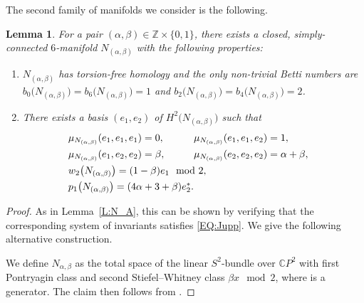 \documentclass[pdftex]{sigma}
\numberwithin{equation}{section}
\newtheorem{Lemma}[Theorem]{Lemma}
\theoremstyle{definition}
\numberwithin{table}{section}
\newcommand{\Z}{\mathbb{Z}}
\newcommand{\C}{\mathbb{C}}
\begin{document}
The second family of manifolds we consider is the following.

\begin{Lemma}%
	For a pair $(\alpha,\beta)\in\Z\times\{0,1\}$, there exists a closed, simply-connected $6$-manifold $N_{(\alpha,\beta)}$ with the following properties:
	\begin{enumerate}\itemsep=0pt
		\item[$(1)$] $N_{(\alpha,\beta)}$ has torsion-free homology and the only non-trivial Betti numbers are $b_0\bigl(N_{(\alpha,\beta)}\bigr)=b_6\bigl(N_{(\alpha,\beta)}\bigr)=1$ and $b_2\bigl(N_{(\alpha,\beta)}\bigr)=b_4\bigl(N_{(\alpha,\beta)}\bigr)=2$.
		\item[$(2)$] There exists a basis $(e_1,e_2)$ of $H^2\bigl(N_{(\alpha,\beta)}\bigr)$ such that
		\begin{alignat*}{3}
			&\mu_{N_{(\alpha,\beta)}}(e_1,e_1,e_1)=0,\qquad&&
			\mu_{N_{(\alpha,\beta)}}(e_1,e_1,e_2)=1,&\\
			&\mu_{N_{(\alpha,\beta)}}(e_1,e_2,e_2)=\beta,\qquad&&
			\mu_{N_{(\alpha,\beta)}}(e_2,e_2,e_2)=\alpha+\beta,&\\
			&\makebox[0pt][l]{$w_2\bigl(N_{(\alpha,\beta)}\bigr)=(1-\beta)e_1\mod 2,$}&\\
			&\makebox[0pt][l]{$p_1\bigl(N_{(\alpha,\beta)}\bigr)=(4\alpha+3+\beta)e_2^*.$}&
		\end{alignat*}
	\end{enumerate}
\end{Lemma}
\begin{proof}
	As in Lemma~\ref{L:N_A}, this can be shown by verifying that the corresponding system of invariants satisfies \eqref{EQ:Jupp}. We give the following alternative construction.
	
	We define $N_{\alpha,\beta}$ as the total space of the linear $S^2$-bundle over $\C P^2$ with first Pontryagin class \smash{$(4\alpha+\beta)\bigl[\C P^2\bigr]^*$} and second Stiefel--Whitney class $\beta x\mod 2$, where \smash{$x\in H^2\bigl(\C P^2\bigr)\cong \Z$} is a generator. The claim then follows from \cite[Corollary 5.8]{Re23}.
\end{proof}
\end{document}
